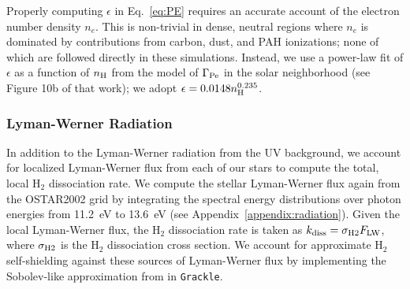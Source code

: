 \documentclass[twocolumn]{aastex61}
\begin{document}
Properly computing $\epsilon$ in Eq.~\ref{eq:PE} requires an accurate account of the electron number density $n_e$. This is non-trivial in dense, neutral regions where $n_e$ is dominated by contributions from carbon, dust, and PAH ionizations; none of which are followed directly in these simulations. Instead, we use a power-law fit of $\epsilon$ as a function of $n_{\rm H}$ from the \citet{Wolfire2003} model of $\Gamma_{\rm{Pe}}$ in the solar neighborhood (see Figure 10b of that work); we adopt $\epsilon = 0.0148n_{\rm{H}}^{0.235}$. %

\subsubsection{Lyman-Werner Radiation}
\label{sec:LW}
In addition to the Lyman-Werner radiation from the UV background, we account for localized Lyman-Werner flux from each of our stars to compute the total, local H$_2$ dissociation rate. We compute the stellar Lyman-Werner flux again from the OSTAR2002 grid by integrating the spectral energy distributions over photon energies from 11.2~eV to 13.6~eV (see Appendix~\ref{appendix:radiation}). Given the local Lyman-Werner flux, the H$_2$ dissociation rate is taken as $k_{\rm diss} = \sigma_{\rm H2} F_{\rm LW}$, where $\sigma_{\rm H2}$ is the H$_2$ dissociation cross section. We account for approximate H$_2$ self-shielding against these sources of Lyman-Werner flux by implementing the Sobolev-like approximation from \citet{Wolcott-Green2011} in \texttt{Grackle}. 

%
%
\end{document}
